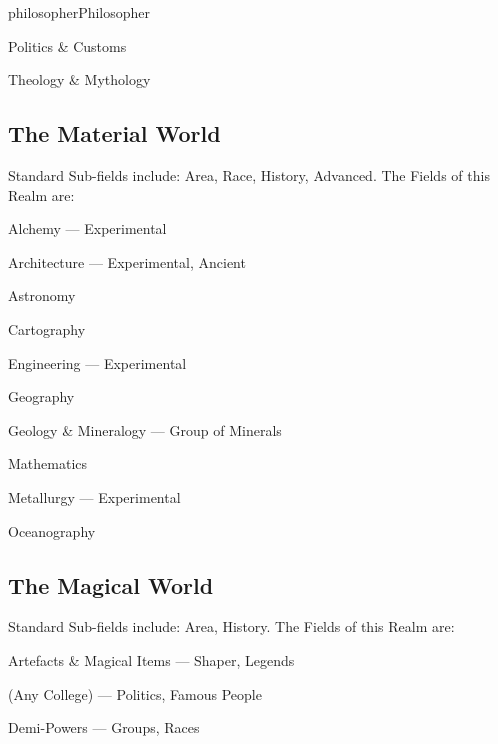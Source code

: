 \begin{Skill}[2.0]{philosopher}{Philosopher}
\begin{Itemize}
\item Politics \& Customs  

\item Theology \& Mythology 
\end{Itemize}
  
\subsection{The Material World}

Standard Sub-fields include: Area, Race, History, Advanced. The Fields
of this Realm are:

\begin{Itemize}
\item Alchemy — Experimental  

\item Architecture — Experimental, Ancient  

\item Astronomy  

\item Cartography  

\item Engineering — Experimental  

\item Geography  

\item Geology \& Mineralogy — Group of Minerals  

\item Mathematics  

\item Metallurgy — Experimental  

\item Oceanography 
\end{Itemize}

\subsection{The Magical World}

Standard Sub-fields include: Area, History.  The Fields of this Realm
are:

\begin{Itemize}
\item Artefacts \& Magical Items — Shaper, Legends  

\item (Any College) — Politics, Famous People  

\item Demi-Powers — Groups, Races  


\end{Itemize}
\end{Skill}
